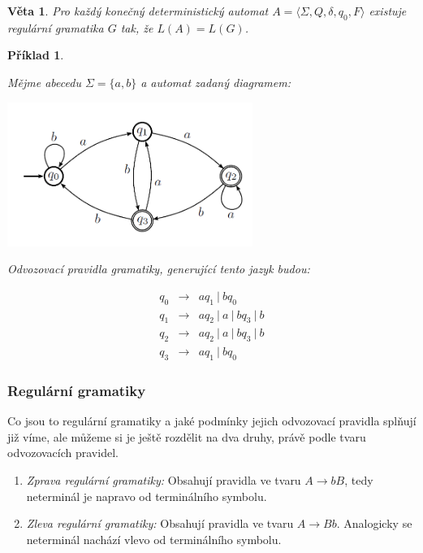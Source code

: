 \documentclass[10pt,a4paper]{article}
\theoremstyle{note}
\newtheorem{veta}{Věta}
\newtheorem{priklad}{Příklad}
\begin{document}
\begin{veta} 
Pro každý konečný deterministický automat $A = \langle \Sigma,Q,\delta,q_0,F \rangle$ existuje regulární gramatika $G$ tak, že $L(A)=L(G)$.
\end{veta}


\begin{priklad}\label{priklad-4}

Mějme abecedu $\Sigma = \lbrace a,b \rbrace$ a automat zadaný diagramem:
\begin{center}
\centering\includegraphics[width=8cm]{img/reg3.png}
\end{center}

Odvozovací pravidla gramatiky, generující tento jazyk budou:

\begin{eqnarray*}
q_0 &\rightarrow& aq_1\ |\ bq_0 \\
q_1 &\rightarrow& aq_2\ |\ a\ |\ bq_3\ |\  b \\
q_2 &\rightarrow& aq_2\ |\ a\ |\ bq_3\ |\  b \\
q_3 &\rightarrow& aq_1\ |\ bq_0
\end{eqnarray*}

\end{priklad}

\subsubsection{Regulární gramatiky}

Co jsou to regulární gramatiky a jaké podmínky jejich odvozovací pravidla splňují již víme, ale můžeme si je ještě rozdělit na dva druhy, právě podle tvaru odvozovacích pravidel.

\begin{enumerate}

\item
\textit{Zprava regulární gramatiky:}
Obsahují pravidla ve tvaru $ A \rightarrow bB $, tedy neterminál je napravo od terminálního symbolu.
\item
\textit{Zleva regulární gramatiky:}
Obsahují pravidla ve tvaru $ A \rightarrow Bb $. Analogicky se neterminál nachází vlevo od terminálního symbolu.
\end{enumerate}
\end{document}
